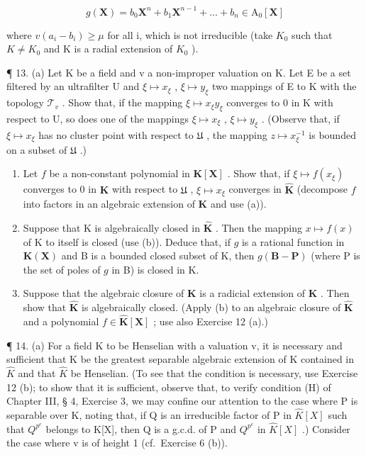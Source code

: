 \[
g (\mathbf {X}) = b _ {0} \mathbf {X} ^ {n} + b _ {1} \mathbf {X} ^ {n - 1} + \dots + b _ {n} \in \mathrm{A} _ {0} [ \mathbf {X} ]
\]

where \(v(a_{i} - b_{i}) \geqslant \mu\) for all i, which is not irreducible (take \(K_{0}\) such that \(K \neq K_{0}\) and K is a radial extension of \(K_{0}\) ).

¶ 13. (a) Let K be a field and v a non-improper valuation on K. Let E be a set filtered by an ultrafilter U and \(\xi \mapsto x_{\xi}\) , \(\xi \mapsto y_{\xi}\) two mappings of E to K with the topology \(\mathcal{T}_{v}\) . Show that, if the mapping \(\xi \mapsto x_{\xi}y_{\xi}\) converges to 0 in K with respect to U, so does one of the mappings \(\xi \mapsto x_{\xi}\) , \(\xi \mapsto y_{\xi}\) . (Observe that, if \(\xi \mapsto x_{\xi}\) has no cluster point with respect to \(\mathfrak{U}\) , the mapping \(z \mapsto x_{\xi}^{-1}\) is bounded on a subset of \(\mathfrak{U}\) .)

\begin{enumerate}
\def\labelenumi{(\alph{enumi})}
\setcounter{enumi}{1}
\item
  Let \(f\) be a non-constant polynomial in \(\mathbf{K}[\mathbf{X}]\) . Show that, if \(\xi \mapsto f(x_{\xi})\) converges to 0 in \(\mathbf{K}\) with respect to \(\mathfrak{U}\) , \(\xi \mapsto x_{\xi}\) converges in \(\hat{\mathbf{K}}\) (decompose \(f\) into factors in an algebraic extension of \(\mathbf{K}\) and use (a)).
\item
  Suppose that K is algebraically closed in \(\hat{\mathbf{K}}\) . Then the mapping \(x \mapsto f(x)\) of K to itself is closed (use (b)). Deduce that, if \(g\) is a rational function in \(\mathbf{K}(\mathbf{X})\) and B is a bounded closed subset of K, then \(g(\mathbf{B} - \mathbf{P})\) (where P is the set of poles of \(g\) in B) is closed in K.
\item
  Suppose that the algebraic closure of \(\mathbf{K}\) is a radicial extension of \(\mathbf{K}\) . Then show that \(\hat{\mathbf{K}}\) is algebraically closed. (Apply (b) to an algebraic closure of \(\hat{\mathbf{K}}\) and a polynomial \(f \in \hat{\mathbf{K}}[\mathbf{X}]\) ; use also Exercise 12 (a).)
\end{enumerate}

¶ 14. (a) For a field K to be Henselian with a valuation v, it is necessary and sufficient that K be the greatest separable algebraic extension of K contained in \(\hat{K}\) and that \(\hat{K}\) be Henselian. (To see that the condition is necessary, use Exercise 12 (b); to show that it is sufficient, observe that, to verify condition (H) of Chapter III, § 4, Exercise 3, we may confine our attention to the case where P is separable over K, noting that, if Q is an irreducible factor of P in \(\hat{K}[X]\) such that \(Q^{p^{e}}\) belongs to K{[}X{]}, then Q is a g.c.d. of P and \(Q^{p^{e}}\) in \(\hat{K}[X]\) .) Consider the case where v is of height 1 (cf.~Exercise 6 (b)).

